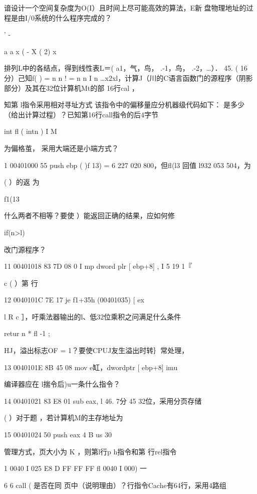 {{   谙设计一个空间复杂度为O(I）且时间上尽可能高效的算法，E新    盘物理地址的过程是由I/0系统的什么程序完成的？

    ’    -

    a    a    x (  -  X (   2) x

   排列L中的各结点，得到线性表L＝( a1，气，鸟， .-1，鸟， .-2，…）．    45. ( 16分）己知f( ) = n    n !  = n   n  I    n     …x2xl，计算J（川的C语言函数门的源程序（阴影部分）及其在32位计算机Mt的部    16行cal    ，

    知第    l指令采用相对寻址方式 该指令中的偏移量应分机器级代码如下：    是多少（给出计算过程）？已知第16行call指令的后4字节

    int  fl ( intn ) I    M

    为偏格茧，  采用大端还是小端方式？

    1  00401000    55     push  ebp    ( )f 13) = 6 227 020 800，但fl(l3    回值  l932 053 504，为

    (     ）的返    为

    f1(13

    什么两者不相等？要使    ）能返回正确的结果，应如何修

    if(n>l)

    改门源程序？

    11 00401018    83 7D 08 0 I     mp  dword plr [ ebp+8] , I    5    19   1『

    c    ( ）第  行

    12 0040101C    7E 17     je  f1+35h (00401035)     [ ex

    l    R c ］，吁乘法器输出的l、低32位乘积之问满足什么条件

    retur n * fl  -1 ;

    HJ，溢出标志OF = 1？要使CPUJ友生溢出时转｝常处理，

    13 0040101E    8B 45 08     mov  e缸，dwordptr [ ebp+8]    imu

    编译器应在   l揣令后)u一条什么指令？

    14 00401021    83 E8 01     sub  eax, l    46.  7分    45    32位，采用分页存储

    (   ）对于题  ，若计算机M的主存地址为

    15 00401024    50     push  eax    4  B    us    30

    管理方式，页大小为  K ，则第l行p h指令和第   行rel指令

    1  0040 I 025    E8 D  FF FF FF     fl  0040 I 000)    一

    6     6     call     (     是否在同  页中（说明理由）？行指令Cache有64行，采用4路组

}}
